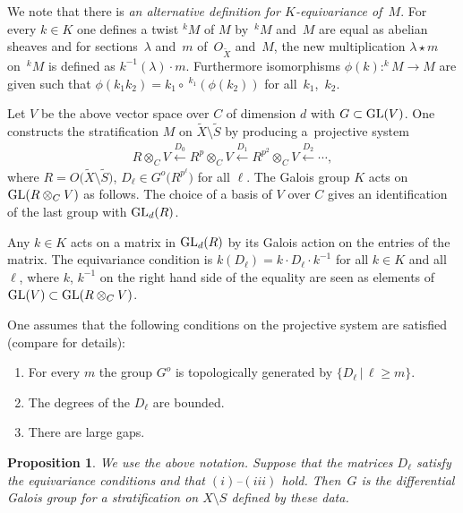 \documentclass[10pt,a4paper]{amsart}
\numberwithin{equation}{section}
\newtheorem{Proposition}[Theorem]{Proposition}
\begin{document}
We note that there is {\it an alternative definition for $K$-equivariance of~$M$}. For every $k\in K$ one defines a twist $^kM$ of $M$ by~$^kM$ and~$M$ are equal as abelian sheaves and for sections~$\lambda$ and~$m$ of~$O_{\tilde{X}}$ and~$M$, the new multiplication $\lambda \star m$ on~$^kM$ is defined as $k^{-1}(\lambda )\cdot m$. Furthermore isomorphisms $\phi (k)\colon ^kM\rightarrow M$ are given such that $\phi(k_1k_2)=k_1\circ \ ^{k_1}(\phi (k_2))$ for all~$k_1$,~$k_2$.

 Let $V$ be the above vector space over $C$ of dimension $d$ with $G\subset {\rm GL}(V)$. One constructs the stratification $M$ on $\tilde{X}\setminus \tilde{S}$ by producing a~projective system
 \begin{gather*} R\otimes_CV\overset{D_0}{\leftarrow} R^p\otimes_CV\overset{D_1}{\leftarrow} R^{p^2}\otimes_CV \overset{D_2}{\leftarrow} \cdots , \end{gather*}
 where $R=O\big(\tilde{X} \setminus \tilde{S}\big)$, $D_\ell \in G^o\big(R^{p^\ell}\big)$ for all $\ell$. The Galois group $K$ acts on ${\rm GL}(R\otimes _CV)$ as follows. The choice of a basis of $V$ over $C$ gives an identification of the last group with ${\rm GL}_d(R)$.

 Any $k\in K$ acts on a matrix in ${\rm GL}_d(R)$ by its Galois action on the entries of the matrix. The equivariance condition is $k(D_\ell)=k\cdot D_\ell \cdot k^{-1}$ for all $k\in K$ and all $\ell$, where $k$, $k^{-1}$ on the right hand side of the equality are seen as elements of ${\rm GL}(V)\subset {\rm GL}(R\otimes _CV)$.

 One assumes that the following conditions on the projective system are satisfied (compare \cite[Lemma 7.4]{Ma-vdP1} for details):
\begin{enumerate}\itemsep=0pt
\item[(i)] For every $m$ the group $G^o$ is topologically generated by $\{D_\ell \, |\, \ell \geq m\}$.
\item[(ii)] The degrees of the $D_\ell$ are bounded.
\item[(iii)] There are large gaps.
\end{enumerate}

 \begin{Proposition}\label{2.8} We use the above notation. Suppose that the matrices $D_\ell$ satisfy the equivariance conditions and that $(i)$--$(iii)$ hold. Then~$G$ is the differential Galois group for a stratification on $X\setminus S$ defined by these data.
\end{Proposition}
\end{document}
